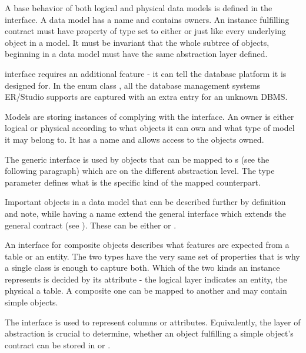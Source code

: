A base behavior of both logical and physical data models is defined in the  interface.
A data model has a name and contains owners. An instance fulfilling  contract must have property of type  set to either  or  just like every underlying object in a model.
It must be invariant that the whole subtree of objects, beginning in a data model must have the same abstraction layer defined.

 interface requires an additional feature - it can tell the database platform it is designed for. 
In the enum class , all the database management systems ER/Studio supports are captured with an extra entry for an unknown DBMS.

Models are storing instances of complying with the  interface. An owner is either logical or physical according to what objects it can own and what type of model it may belong to. 
It has a name and allows access to the objects owned.

The generic interface  is used by objects that can be mapped to s (see the following paragraph) which are on the different abstraction level. The type parameter defines what is the specific kind of the mapped counterpart.

Important objects in a data model that can be described further by definition and note, while having a name extend the general  interface which extends the general  contract (see ). 
These can be either  or .

An interface for composite objects describes what features are expected from a table or an entity.
The two types have the very same set of properties that is why a single class is enough to capture both. 
Which of the two kinds an instance represents is decided by its  attribute - the logical layer indicates an entity, the physical a table.
A composite one can be mapped to another  and may contain simple objects.

The  interface is used to represent columns or attributes. Equivalently, the layer of abstraction is crucial to determine, whether an object fulfilling a simple object's contract can be stored in  or .

